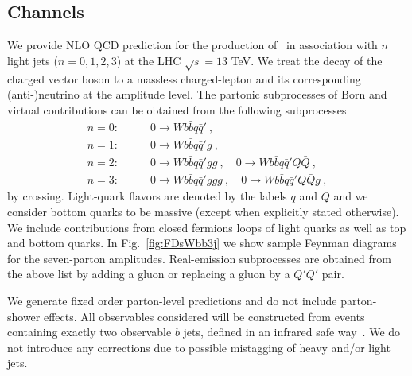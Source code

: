 \subsection{Channels}
\label{sec:calcsetup}

We provide NLO QCD prediction for the production of \Wbb~in association with $n$ light jets ($n =
0,1,2,3$) at the LHC $\sqrt{s} = 13$ TeV. We treat the decay of the charged vector boson to a
massless charged-lepton and its corresponding (anti-)neutrino at the
amplitude level. 
The partonic subprocesses of Born and virtual contributions
can be obtained from the following subprocesses
%
\begin{subequations}
  \begin{align}
    n=0:&\qquad 0\rightarrow Wb{\bar b}q{\bar q}'\ ,\\
    n=1:&\qquad 0\rightarrow Wb{\bar b}q{\bar q}'g\ ,\\
    n=2:&\qquad 0\rightarrow Wb{\bar b}q{\bar q}'gg\ ,\quad  0\rightarrow Wb{\bar b}q{\bar q}'Q{\bar Q}\ ,\\
    n=3:&\qquad 0\rightarrow Wb{\bar b}q{\bar q}'ggg\ ,\quad  0\rightarrow Wb{\bar b}q{\bar q}'Q{\bar Q}g\ ,
  \end{align}
\end{subequations}
by crossing. Light-quark flavors are denoted by the labels $q$ and $Q$ and we consider bottom quarks to be massive (except when
explicitly stated otherwise). We include contributions from closed fermions loops of light
quarks as well as top and bottom quarks. In Fig.~\ref{fig:FDsWbb3j} we show sample Feynman diagrams for the seven-parton amplitudes. Real-emission subprocesses are obtained from the above list by adding a gluon
or replacing a gluon by a $Q'{\bar Q'}$ pair. 

We generate fixed order parton-level predictions and do not include parton-shower
effects. All observables considered will be constructed from events containing
exactly two observable $b$ jets, defined in an infrared safe
way~\cite{Banfi:2006hf}. We do not introduce any corrections due to possible
mistagging of heavy and/or light jets. 

